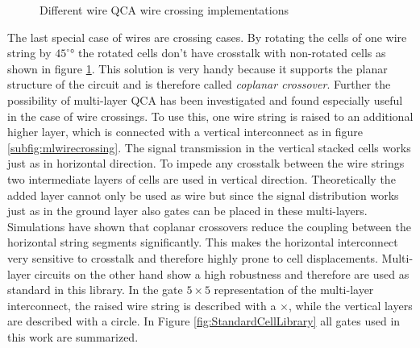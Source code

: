 \begin{figure}
{ 
		\label{subfig:CoplanarWire}
	}
	
	\caption{Different wire QCA wire crossing implementations} 
\end{figure}
The last special case of wires are crossing cases. By rotating the cells of one wire string by $45^{\circ}°$ the rotated cells don't have crosstalk with non-rotated cells \cite{Inverter_displacements} as shown in figure \ref{subfig:CoplanarWire}. This solution is very handy because it supports the planar structure of the circuit and is therefore called \textit{coplanar crossover}. Further the possibility of multi-layer QCA has been investigated and found especially useful in the case of wire crossings. To use this, one wire string is raised to an additional higher layer, which is connected with a vertical interconnect as in figure \ref{subfig:mlwirecrossing}. The signal transmission in the vertical stacked cells works just as in horizontal direction. To impede any crosstalk between the wire strings two intermediate layers of cells are used in vertical direction. Theoretically the added layer cannot only be used as wire but since the signal distribution works just as in the ground layer also gates can be placed in these multi-layers. Simulations have shown that coplanar crossovers reduce the coupling between the horizontal string segments significantly. This makes the horizontal interconnect very sensitive to crosstalk and therefore highly prone to cell displacements. Multi-layer circuits on the other hand show a high robustness and therefore are used as standard in this library. In the gate $5 \times 5$ representation of the multi-layer interconnect, the raised wire string is described with a $\times$, while the vertical layers are described with a circle. In Figure \ref{fig:StandardCellLibrary} all gates used in this work are summarized.

